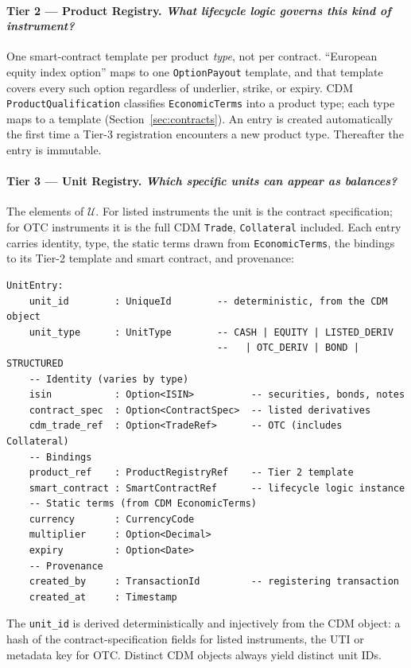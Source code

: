 \paragraph{Tier 2 --- Product Registry. \emph{What lifecycle logic governs this kind of instrument?}}
One smart-contract template per product \emph{type}, not per contract. ``European equity index option'' maps to one \texttt{OptionPayout} template, and that template covers every such option regardless of underlier, strike, or expiry. CDM \texttt{ProductQualification} classifies \texttt{EconomicTerms} into a product type; each type maps to a template (Section~\ref{sec:contracts}). An entry is created automatically the first time a Tier-3 registration encounters a new product type. Thereafter the entry is immutable.

\paragraph{Tier 3 --- Unit Registry. \emph{Which specific units can appear as balances?}}
The elements of $\mathcal{U}$. For listed instruments the unit is the contract specification; for OTC instruments it is the full CDM \texttt{Trade}, \texttt{Collateral} included. Each entry carries identity, type, the static terms drawn from \texttt{EconomicTerms}, the bindings to its Tier-2 template and smart contract, and provenance:

\begin{lstlisting}
UnitEntry:
    unit_id        : UniqueId        -- deterministic, from the CDM object
    unit_type      : UnitType        -- CASH | EQUITY | LISTED_DERIV
                                     --   | OTC_DERIV | BOND | STRUCTURED
    -- Identity (varies by type)
    isin           : Option<ISIN>          -- securities, bonds, notes
    contract_spec  : Option<ContractSpec>  -- listed derivatives
    cdm_trade_ref  : Option<TradeRef>      -- OTC (includes Collateral)
    -- Bindings
    product_ref    : ProductRegistryRef    -- Tier 2 template
    smart_contract : SmartContractRef      -- lifecycle logic instance
    -- Static terms (from CDM EconomicTerms)
    currency       : CurrencyCode
    multiplier     : Option<Decimal>
    expiry         : Option<Date>
    -- Provenance
    created_by     : TransactionId         -- registering transaction
    created_at     : Timestamp
\end{lstlisting}

The \texttt{unit\_id} is derived deterministically and injectively from the CDM object: a hash of the contract-specification fields for listed instruments, the UTI or metadata key for OTC. Distinct CDM objects always yield distinct unit IDs.


